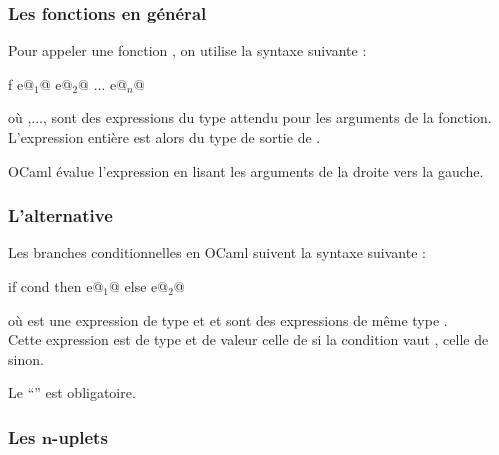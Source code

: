  		\subsubsection{Les fonctions en général}
 			
 			\begin{Syntaxe}
 			Pour appeler une fonction , on utilise la syntaxe suivante :
 			
 				\begin{Caml}
 								f e@$_1$@ e@$_2$@ ... e@$_n$@
 				\end{Caml}
 			où ,..., sont des expressions du type attendu pour les arguments de la fonction. L'expression entière est alors du type de sortie de .
 			\end{Syntaxe}
 		
 			\begin{Remarque}
 				OCaml évalue l'expression en lisant les arguments de la droite vers la gauche.
 			\end{Remarque}
 		
 		\subsubsection{L'alternative}
 			
 			\begin{Syntaxe}
 			Les branches conditionnelles en OCaml suivent la syntaxe suivante : 
 			
 				\begin{Caml}
 							if cond then e@$_1$@ else e@$_2$@
 				\end{Caml}
 			
 			où  est une expression de type  et  et  sont des expressions de même type . \\
 			Cette expression est de type  et de valeur celle de  si la condition vaut , celle de  sinon.
 			\end{Syntaxe}
 		
 			\begin{Remarque}
 				Le ``'' est obligatoire.
 			\end{Remarque}
 		
 		\subsubsection{Les \(\bm{n}\)-uplets}
 			
